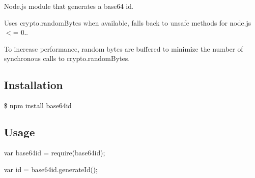 Node.\+js module that generates a base64 id.

Uses crypto.\+random\+Bytes when available, falls back to unsafe methods for node.\+js $<$= 0..

To increase performance, random bytes are buffered to minimize the number of synchronous calls to crypto.\+random\+Bytes.

\subsection*{Installation}

\$ npm install base64id

\subsection*{Usage}

var base64id = require(\textquotesingle{}base64id\textquotesingle{});

var id = base64id.\+generate\+Id(); 